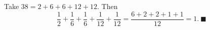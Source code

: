 Take $38=2+6+6+12+12$. Then
\[\dfrac12+\dfrac16+\dfrac16+\dfrac1{12}+\dfrac1{12}=\dfrac{6+2+2+1+1}{12}=1.\ \blacksquare\]
